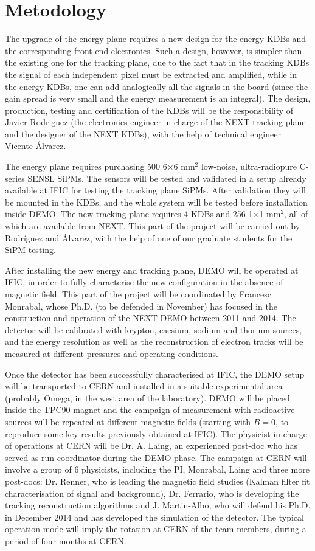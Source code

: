 \section*{Metodology}
The upgrade of the energy plane requires a new design for the energy KDBs and the corresponding front-end electronics. Such a design, however, is simpler than the existing one for the tracking plane, due to the fact that in the tracking KDBs the signal of each independent pixel must be extracted and amplified, while in the energy KDBs, one can add analogically all the signals in the board (since the gain spread is very small and the energy measurement is an integral). The design, production, testing and certification of the KDBs will be the responsibility of Javier Rodriguez (the electronics engineer in charge of the NEXT tracking plane and the designer of the NEXT KDBs), with the help of technical engineer Vicente Álvarez. 

The energy plane requires purchasing 500 6$\times$6 mm$^2$ low-noise, ultra-radiopure C-series SENSL SiPMs. The sensors will be tested and validated in a setup already available at IFIC for testing the tracking plane SiPMs. After validation they will be mounted in the KDBs, and the whole system will be tested before installation inside DEMO. The new tracking plane requires 4 KDBs and 256 1$\times$1 mm$^2$, all of which are available from NEXT. This part of the project will be carried out by Rodríguez and Álvarez, with the help of one of our graduate students for the SiPM testing. 

After installing the new energy and tracking plane, DEMO will be operated at IFIC, in order to fully characterise the new configuration in the absence of magnetic field. This part of the project will be coordinated by Francesc Monrabal, whose Ph.D. (to be defended in November) has focused in the construction and operation of the NEXT-DEMO between 2011 and 2014. The detector will be calibrated with krypton, caesium, sodium and thorium sources, and the energy resolution as well as the reconstruction of electron tracks will be measured at different pressures and operating conditions. 

Once the detector has been successfully characterised at IFIC, the DEMO setup will be transported to CERN and installed in a suitable experimental area (probably Omega, in the west area of the laboratory). DEMO will be placed inside the TPC90 magnet and the campaign of measurement with radioactive sources will be repeated at different magnetic fields (starting with $B=0$, to reproduce some key results previously obtained at IFIC). The physicist in charge of operations at CERN will be Dr. A. Laing, an experienced post-doc who has served as run coordinator during the DEMO phase. The campaign at CERN will involve a group of 6 physicists, including the PI, Monrabal, Laing and three more post-docs: Dr. Renner, who is leading the magnetic field studies (Kalman filter fit characterisation of signal and background), Dr. Ferrario, who is developing the tracking reconstruction algorithms and  
J. Martin-Albo, who will defend his Ph.D. in December 2014 and has developed the simulation of the detector. The typical operation mode will imply the rotation at CERN of the team members, during a period of four months at CERN.   

